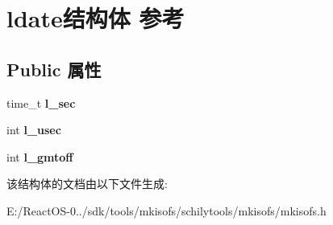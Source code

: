 \hypertarget{structldate}{}\section{ldate结构体 参考}
\label{structldate}
\subsection*{Public 属性}
\begin{DoxyCompactItemize}
\item 
\mbox{\label{structldate_af92fdaed8b3e2894171c21e5aefff890}} 
time\+\_\+t {\bfseries l\+\_\+sec}
\item 
\mbox{\label{structldate_afd326a7b90780c30ce9d7e4281a59df6}} 
int {\bfseries l\+\_\+usec}
\item 
\mbox{\label{structldate_ae087af89f5ee9e40d660e12045a43c83}} 
int {\bfseries l\+\_\+gmtoff}
\end{DoxyCompactItemize}


该结构体的文档由以下文件生成\+:\begin{DoxyCompactItemize}
\item 
E\+:/\+React\+O\+S-\/0../sdk/tools/mkisofs/schilytools/mkisofs/mkisofs.\+h\end{DoxyCompactItemize}
